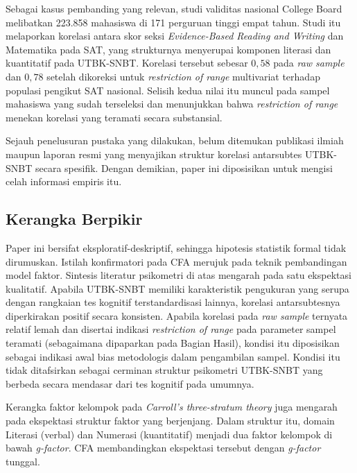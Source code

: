 Sebagai kasus pembanding yang relevan, studi validitas nasional College Board \autocite{westrick2019} melibatkan 223.858 mahasiswa di 171 perguruan tinggi empat tahun. Studi itu melaporkan korelasi antara skor seksi \textit{Evidence-Based Reading and Writing} dan Matematika pada SAT, yang strukturnya menyerupai komponen literasi dan kuantitatif pada UTBK-SNBT. Korelasi tersebut sebesar $0,58$ pada \textit{raw sample} dan $0,78$ setelah dikoreksi untuk \textit{restriction of range} multivariat terhadap populasi pengikut SAT nasional. Selisih kedua nilai itu muncul pada sampel mahasiswa yang sudah terseleksi dan menunjukkan bahwa \textit{restriction of range} menekan korelasi yang teramati secara substansial.

Sejauh penelusuran pustaka yang dilakukan, belum ditemukan publikasi ilmiah maupun laporan resmi yang menyajikan struktur korelasi antarsubtes UTBK-SNBT secara spesifik. Dengan demikian, paper ini diposisikan untuk mengisi celah informasi empiris itu.

\subsection{Kerangka Berpikir}
Paper ini bersifat eksploratif-deskriptif, sehingga hipotesis statistik formal tidak dirumuskan. Istilah konfirmatori pada CFA merujuk pada teknik pembandingan model faktor. Sintesis literatur psikometri di atas mengarah pada satu ekspektasi kualitatif. Apabila UTBK-SNBT memiliki karakteristik pengukuran yang serupa dengan rangkaian tes kognitif terstandardisasi lainnya, korelasi antarsubtesnya diperkirakan positif secara konsisten. Apabila korelasi pada \textit{raw sample} ternyata relatif lemah dan disertai indikasi \textit{restriction of range} pada parameter sampel teramati (sebagaimana dipaparkan pada Bagian Hasil), kondisi itu diposisikan sebagai indikasi awal bias metodologis dalam pengambilan sampel. Kondisi itu tidak ditafsirkan sebagai cerminan struktur psikometri UTBK-SNBT yang berbeda secara mendasar dari tes kognitif pada umumnya.

Kerangka faktor kelompok pada \textit{Carroll's three-stratum theory} juga mengarah pada ekspektasi struktur faktor yang berjenjang. Dalam struktur itu, domain Literasi (verbal) dan Numerasi (kuantitatif) menjadi dua faktor kelompok di bawah \textit{g-factor}. CFA membandingkan ekspektasi tersebut dengan \textit{g-factor} tunggal.